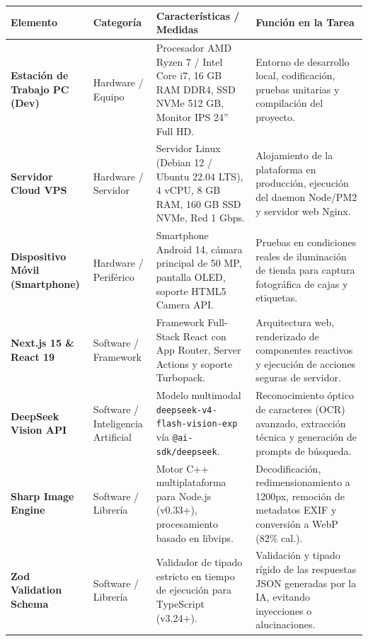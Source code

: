 \documentclass[11pt,a4paper]{article}
\begin{document}
\begin{table}[htbp]
\centering
\small
\begin{tabularx}{\textwidth}{p{3.2cm} p{2.8cm} p{4.2cm} X}
\toprule
\rowcolor{tableheader}
\color{white}\textbf{Elemento} & \color{white}\textbf{Categoría} & \color{white}\textbf{Características / Medidas} & \color{white}\textbf{Función en la Tarea} \\
\midrule
\rowcolor{lightrow}
\textbf{Estación de Trabajo PC (Dev)} & Hardware / Equipo & Procesador AMD Ryzen 7 / Intel Core i7, 16 GB RAM DDR4, SSD NVMe 512 GB, Monitor IPS 24'' Full HD. & Entorno de desarrollo local, codificación, pruebas unitarias y compilación del proyecto. \\
\midrule
\textbf{Servidor Cloud VPS} & Hardware / Servidor & Servidor Linux (Debian 12 / Ubuntu 22.04 LTS), 4 vCPU, 8 GB RAM, 160 GB SSD NVMe, Red 1 Gbps. & Alojamiento de la plataforma en producción, ejecución del daemon Node/PM2 y servidor web Nginx. \\
\midrule
\rowcolor{lightrow}
\textbf{Dispositivo Móvil (Smartphone)} & Hardware / Periférico & Smartphone Android 14, cámara principal de 50 MP, pantalla OLED, soporte HTML5 Camera API. & Pruebas en condiciones reales de iluminación de tienda para captura fotográfica de cajas y etiquetas. \\
\midrule
\textbf{Next.js 15 \& React 19} & Software / Framework & Framework Full-Stack React con App Router, Server Actions y soporte Turbopack. & Arquitectura web, renderizado de componentes reactivos y ejecución de acciones seguras de servidor. \\
\midrule
\rowcolor{lightrow}
\textbf{DeepSeek Vision API} & Software / Inteligencia Artificial & Modelo multimodal \texttt{deepseek-v4-flash-vision-exp} vía \texttt{@ai-sdk/deepseek}. & Reconocimiento óptico de caracteres (OCR) avanzado, extracción técnica y generación de prompts de búsqueda. \\
\midrule
\textbf{Sharp Image Engine} & Software / Librería & Motor C++ multiplataforma para Node.js (v0.33+), procesamiento basado en libvips. & Decodificación, redimensionamiento a 1200px, remoción de metadatos EXIF y conversión a WebP (82\% cal.). \\
\midrule
\rowcolor{lightrow}
\textbf{Zod Validation Schema} & Software / Librería & Validador de tipado estricto en tiempo de ejecución para TypeScript (v3.24+). & Validación y tipado rígido de las respuestas JSON generadas por la IA, evitando inyecciones o alucinaciones. \\
\midrule

\end{tabularx}
\end{table}
\end{document}
